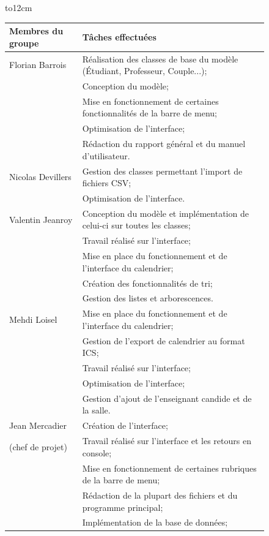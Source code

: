 \documentclass[a4paper,10pt]{report}
\begin{document}
      \begin{figure}[H]
	\hbox to12cm{\hss
	  \begin{tabular}{|l|l|}
	    \hline
	    \textbf{Membres du groupe} & \textbf{Tâches effectuées} \\
	    \hline
	      Florian Barrois 
	      & Réalisation des classes de base du modèle (Étudiant, Professeur, Couple...); \\
	      & Conception du modèle; \\
	      & Mise en fonctionnement de certaines fonctionnalités de la barre de menu;\\
	      & Optimisation de l'interface;\\
	      & Rédaction du rapport général et du manuel d'utilisateur.\\
	    \hline
	      Nicolas Devillers 
	      & Gestion des classes permettant l'import de fichiers CSV;\\
	      & Optimisation de l'interface.\\
	      \hline
	      Valentin Jeanroy 
	      & Conception du modèle et implémentation de celui-ci sur toutes les classes; \\
	      & Travail réalisé sur l'interface;\\
	      & Mise en place du fonctionnement et de l'interface du calendrier;\\
	      & Création des fonctionnalités de tri;\\
	      & Gestion des listes et arborescences.\\
	      \hline
	      Mehdi Loisel 
	      & Mise en place du fonctionnement et de l'interface du calendrier; \\
	      & Gestion de l'export de calendrier au format ICS;\\
	      & Travail réalisé sur l'interface;\\
	      & Optimisation de l'interface;\\
	      & Gestion d'ajout de l'enseignant candide et de la salle.\\
	      \hline
	      Jean Mercadier
	      & Création de l'interface; \\
	      (chef de projet)& Travail réalisé sur l'interface et les retours en console;\\
	      & Mise en fonctionnement de certaines rubriques de la barre de menu;\\
	      & Rédaction de la plupart des fichiers et du programme principal;\\
	      & Implémentation de la base de données;\\

\end{tabular}}
\end{figure}
\end{document}
